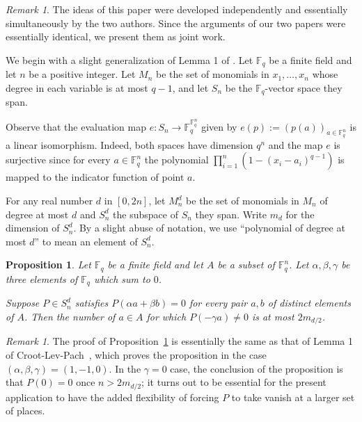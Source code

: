 \documentclass[12pt]{amsart}
\newcommand{\field}[1]{\mathbb{#1}}
\newcommand{\F}{\field{F}}
\theoremstyle{plain}
\newtheorem{prop}[thm]{Proposition}
\theoremstyle{definition}
\theoremstyle{remark}
\newtheorem{rem}[thm]{Remark}
\begin{document}
\begin{rem}  The ideas of this paper were developed independently and essentially simultaneously by the two authors.  Since the arguments of our two papers were essentially identical, we present them as joint work.
\end{rem}

We begin with a slight generalization of Lemma 1 of \cite{CLP}.
Let $\F_q$ be a finite field and let $n$ be a positive integer. Let $M_n$ be the set of monomials in $x_1,\ldots, x_n$ whose degree in each variable is at most $q-1$, and let $S_n$ be the $\F_q$-vector space they span. 

Observe that the evaluation map $e: S_n\to\F_q^{\F_q^n}$ given by $e(p):=(p(a))_{a\in\F_q^n}$ is a linear isomorphism. Indeed, both spaces have dimension $q^n$ and the map $e$ is surjective since for every $a\in \F_q^n$ the polynomial $\prod_{i=1}^n (1-(x_i-a_i)^{q-1})$ is mapped to the indicator function of point $a$. 

For any real number $d$ in $[0,2n]$, let $M_n^d$ be the set of monomials in $M_n$ of degree at most $d$ and $S_n^d$ the subspace of $S_n$ they span. Write $m_d$ for the dimension of $S_n^d$.  By a slight abuse of notation, we use ``polynomial of degree at most $d$'' to mean an element of $S_n^d$.


\begin{prop}  Let $\F_q$ be a finite field and let $A$ be a subset of $\F_q^n$. Let $\alpha, \beta, \gamma$ be three elements of $\F_q$ which sum to $0$.

Suppose $P \in S_n^d$ satisfies $P(\alpha a+\beta b) = 0$ for every pair $a,b$ of distinct elements of $A$.  Then the number of $a \in A$ for which $P(-\gamma a) \neq 0$ is at most $2 m_{d/2}$.

\label{pr:clp}
\end{prop}

\begin{rem}
The proof of Proposition~\ref{pr:clp} is essentially the same as that of Lemma 1 of Croot-Lev-Pach~\cite{CLP}, which proves the proposition in the case $(\alpha,\beta,\gamma) = (1,-1,0)$.  In the $\gamma=0$ case, the conclusion of the proposition is that $P(0) = 0$ once $n > 2 m_{d/2}$; it turns out to be essential for the present application to have the added flexibility of forcing $P$ to take vanish at a larger set of places.
\end{rem}
\end{document}
